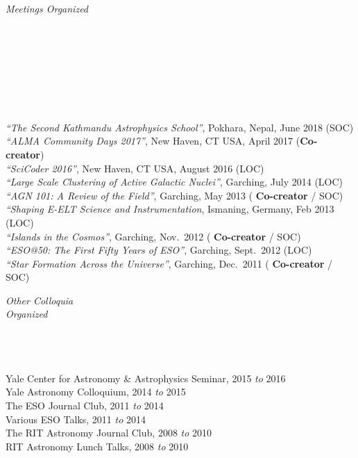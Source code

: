 \documentclass[11pt]{article}
\begin{document}
\vspace{4mm}



\hspace{2.5mm} \parbox{1.5in}{\textit{Meetings Organized} \\\\\\\\\\\\\\\\} \parbox{5.15in}{
\textit{``The Second Kathmandu Astrophysics School''}, Pokhara, Nepal, June 2018 (SOC) \\
\textit{``ALMA Community Days 2017''}, New Haven, CT USA, April 2017 (\textbf{Co-creator}) \\
\textit{``SciCoder 2016''}, New Haven, CT USA, August 2016 (LOC)\\
\textit{``Large Scale Clustering of Active Galactic Nuclei''}, Garching, July 2014 (LOC)\\
\textit{``AGN 101: A Review of the Field''}, Garching, May 2013 (\textbf{ Co-creator} / SOC)\\
\textit{``Shaping E-ELT Science and Instrumentation}, Ismaning, Germany, Feb 2013 (LOC)\\
\textit{``Islands in the Cosmos''}, Garching, Nov.~2012 (\textbf{ Co-creator} / SOC)\\
\textit{``ESO@50: The First Fifty Years of ESO''}, Garching, Sept.~2012  (LOC)\\
\textit{``Star Formation Across the Universe''}, Garching, Dec.~2011 (\textbf{ Co-creator} / SOC)
}


\vspace{4mm}


\hspace{2.5mm} \parbox{1.5in}{\textit{Other Colloquia \\ Organized \\\\\\\\} } \parbox{5.15in}{Yale Center for Astronomy \& Astrophysics Seminar, 2015 \textit{to} 2016 \\ Yale Astronomy Colloquium, 2014 \textit{to} 2015 \\ The ESO Journal Club, 2011 \textit{to} 2014 \\ Various ESO Talks, 2011 \textit{to} 2014 \\ The RIT Astronomy Journal Club, 2008 \textit{to} 2010 \\ RIT Astronomy Lunch Talks, 2008 \textit{to} 2010 }\\
\end{document}
